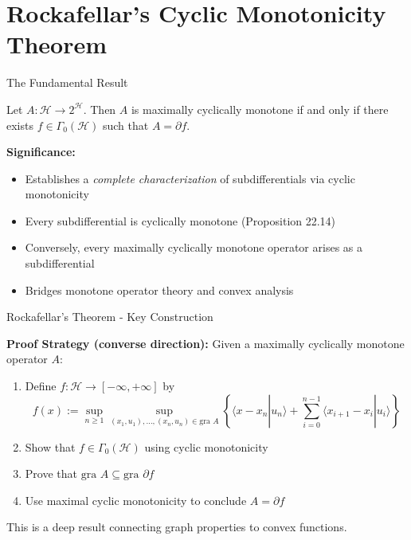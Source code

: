 \documentclass[aspectratio=169,10pt]{beamer}
\begin{document}
\section{Rockafellar's Cyclic Monotonicity Theorem}

\begin{frame}{The Fundamental Result}
    \begin{theorem}[22.18 - Rockafellar]
        Let $A: \mathcal{H} \to 2^{\mathcal{H}}$. Then $A$ is maximally cyclically monotone if and only if
        there exists $f \in \Gamma_0(\mathcal{H})$ such that $A = \partial f$.
    \end{theorem}

    \vspace{0.5cm}
    \textbf{Significance:}
    \begin{itemize}
        \item Establishes a \emph{complete characterization} of subdifferentials via cyclic monotonicity
        \item Every subdifferential is cyclically monotone (Proposition 22.14)
        \item Conversely, every maximally cyclically monotone operator arises as a subdifferential
        \item Bridges monotone operator theory and convex analysis
    \end{itemize}
\end{frame}

\begin{frame}{Rockafellar's Theorem - Key Construction}
    \begin{theorem}
    \textbf{Proof Strategy (converse direction):} Given a maximally cyclically monotone operator $A$:

    \begin{enumerate}
        \item Define $f: \mathcal{H} \to [-\infty, +\infty]$ by
            $$f(x) := \sup_{n \geq 1} \sup_{(x_1, u_1), \ldots, (x_n, u_n) \in \text{gra } A}
            \left\{ \langle x - x_n | u_n \rangle + \sum_{i=0}^{n-1} \langle x_{i+1} - x_i | u_i \rangle \right\}$$

        \item Show that $f \in \Gamma_0(\mathcal{H})$ using cyclic monotonicity

        \item Prove that $\text{gra } A \subseteq \text{gra } \partial f$

        \item Use maximal cyclic monotonicity to conclude $A = \partial f$
    \end{enumerate}
    \end{theorem}

    \vspace{0.3cm}
    This is a deep result connecting graph properties to convex functions.
\end{frame}
\end{document}

